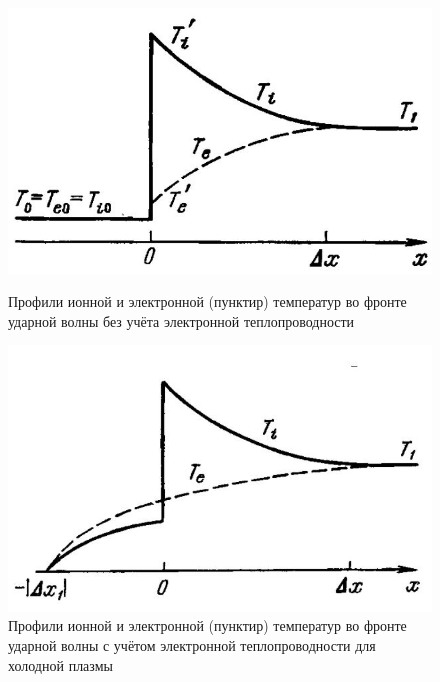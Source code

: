 \documentclass[10pt, a4paper]{article}
\begin{document}
\begin{figure}[ht]
	\begin{center}
		\begin{minipage}[ht]{0.49\linewidth}
			\includegraphics[height=0.15\textheight]{13. Skach plotn.JPG}
			\caption{Профили ионной и электронной (пунктир) температур во фронте ударной волны без учёта электронной теплопроводности~\cite{zeldovich}}
			\label{fig:shock_wave_T} 
		\end{minipage}
		\hfill
		\begin{minipage}[ht]{0.49\linewidth}
			\includegraphics[height=0.15\textheight]{13. teploprov.JPG}
			\caption{Профили ионной и электронной (пунктир) температур во фронте ударной волны с учётом электронной теплопроводности для холодной плазмы~\cite{zeldovich}}
			\label{fig:shock_wave_T_diff} 
		\end{minipage}
	\end{center}
\end{figure}
\end{document}
